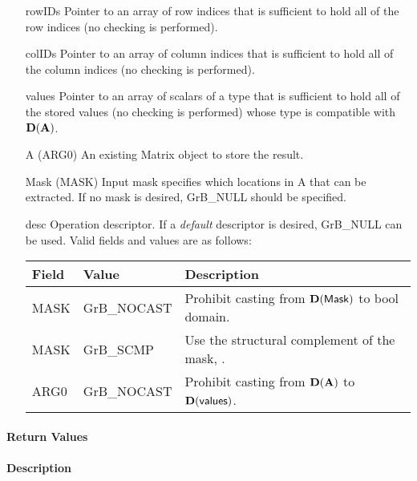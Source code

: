 \begin{itemize}[leftmargin=1.1in]
    \item[{\sf rowIDs}] Pointer to an array of row indices that is sufficient to
                        hold all of the row indices (no checking is performed).
    \item[{\sf colIDs}] Pointer to an array of column indices that is sufficient to
                        hold all of the column indices (no checking is performed). 
    \item[{\sf values}] Pointer to an array of scalars of a type that is sufficient to
                        hold all of the stored values (no checking is performed) whose
                        type is compatible with $\bold{D}({\bf A})$.
    \item[{\sf A}]      ({\sf ARG0}) An existing Matrix object to store the result.
    \item[{\sf Mask}]   ({\sf MASK}) Input mask specifies which locations in
                        {\sf A} that can be extracted.  If no mask is desired,
                        {\sf GrB\_NULL} should be specified.
    \item[{\sf desc}]   Operation descriptor. If a
    \emph{default} descriptor is desired, {\sf GrB\_NULL} can be
    used.  Valid fields and values are as follows: \\
    \begin{tabular}{lll}
    Field  & Value & Description \\
    \hline
    {\sf MASK} & {\sf GrB\_NOCAST} & Prohibit casting from $\bold{D}({\sf Mask})$ to {\sf bool} domain. \\
    {\sf MASK} & {\sf GrB\_SCMP}   & Use the structural complement of the mask, . \\
    {\sf ARG0} & {\sf GrB\_NOCAST} & Prohibit casting from $\bold{D}({\bf A})$ to $\bold{D}({\sf values})$. \\
    \end{tabular}
\end{itemize}

\paragraph{Return Values}
%
\paragraph{Description}



